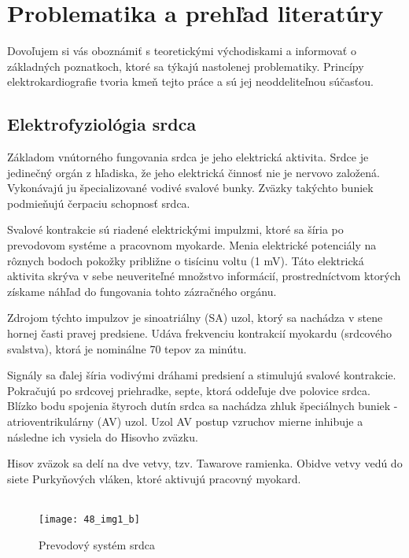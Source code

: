 \documentclass[titlepage,12pt]{article}
\begin{document}
\newpage
\section{Problematika a prehľad literatúry}
Dovoľujem si vás oboznámiť s teoretickými východiskami a informovať o základných poznatkoch, ktoré sa týkajú nastolenej problematiky. Princípy elektrokardiografie tvoria kmeň tejto práce a sú jej neoddeliteľnou súčasťou.


\subsection{Elektrofyziológia srdca}

Základom vnútorného fungovania srdca je jeho elektrická aktivita. Srdce je jedinečný orgán z hľadiska, že jeho elektrická činnosť nie je nervovo založená. Vykonávajú ju špecializované vodivé svalové bunky. Zväzky takýchto buniek podmieňujú čerpaciu schopnosť srdca.

Svalové kontrakcie sú riadené elektrickými impulzmi, ktoré sa šíria po prevodovom systéme a pracovnom myokarde. Menia elektrické potenciály na rôznych bodoch pokožky približne o tisícinu voltu (1 mV). Táto elektrická aktivita skrýva v sebe neuveriteľné množstvo informácií, prostredníctvom ktorých získame náhľad do fungovania tohto zázračného orgánu.

Zdrojom týchto impulzov je sinoatriálny (SA) uzol, ktorý sa nachádza v stene hornej časti pravej predsiene. Udáva frekvenciu kontrakcií myokardu (srdcového svalstva), ktorá je nominálne 70 tepov za minútu.

Signály sa ďalej šíria vodivými dráhami predsiení a stimulujú svalové kontrakcie. Pokračujú po srdcovej priehradke, septe, ktorá oddeľuje dve polovice srdca. Blízko bodu spojenia štyroch dutín srdca sa nachádza zhluk špeciálnych buniek - atrioventrikulárny (AV) uzol. Uzol AV postup vzruchov mierne inhibuje a následne ich vysiela do Hisovho zväzku.

Hisov zväzok  sa delí na dve vetvy, tzv. Tawarove ramienka. Obidve vetvy vedú do siete Purkyňových vláken, ktoré aktivujú pracovný myokard.
\\
\\

\begin{figure}[!ht]
\begin{center}
\texttt{[image: 48\_img1\_b]}
\caption{Prevodový systém srdca}
\end{center}
\end{figure}
\end{document}

